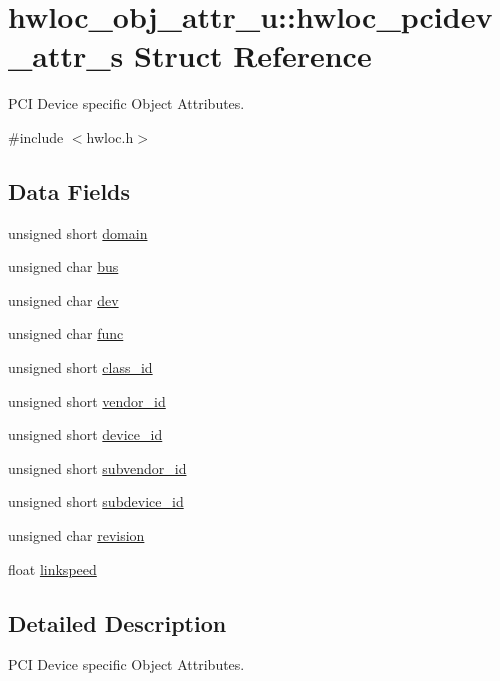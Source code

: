 \hypertarget{a00022}{
\section{hwloc\_\-obj\_\-attr\_\-u::hwloc\_\-pcidev\_\-attr\_\-s Struct Reference}
\label{a00022}
}


PCI Device specific Object Attributes.  




{\ttfamily \#include $<$hwloc.h$>$}

\subsection*{Data Fields}
\begin{DoxyCompactItemize}
\item 
unsigned short \hyperlink{a00022_a8fba44988deb98613c1505a4019a34dc}{domain}
\item 
unsigned char \hyperlink{a00022_aae99e035e8d1387d7b8768aaa8eceb0a}{bus}
\item 
unsigned char \hyperlink{a00022_a3d70c84a12f7e93d14c8d47bf4fd9dc5}{dev}
\item 
unsigned char \hyperlink{a00022_a695f32df53f4ef728670bfcf31b74e0f}{func}
\item 
unsigned short \hyperlink{a00022_aee735352d9f1686fd290fc6d6397c334}{class\_\-id}
\item 
unsigned short \hyperlink{a00022_aad970ad19b62eb2d5df30e4802da4f4c}{vendor\_\-id}
\item 
unsigned short \hyperlink{a00022_a35b66064ab7d768caf7154e410caf0fa}{device\_\-id}
\item 
unsigned short \hyperlink{a00022_a499db3d8cc89eaba04fcaef3df1cba97}{subvendor\_\-id}
\item 
unsigned short \hyperlink{a00022_acac741aecd7a6db64f33409427e3971f}{subdevice\_\-id}
\item 
unsigned char \hyperlink{a00022_a13ad54c93d08d8ac808e4de9674c5ee7}{revision}
\item 
float \hyperlink{a00022_a59b2fce35f7cbde86c4fd305d0ccda5f}{linkspeed}
\end{DoxyCompactItemize}


\subsection{Detailed Description}
PCI Device specific Object Attributes. 

